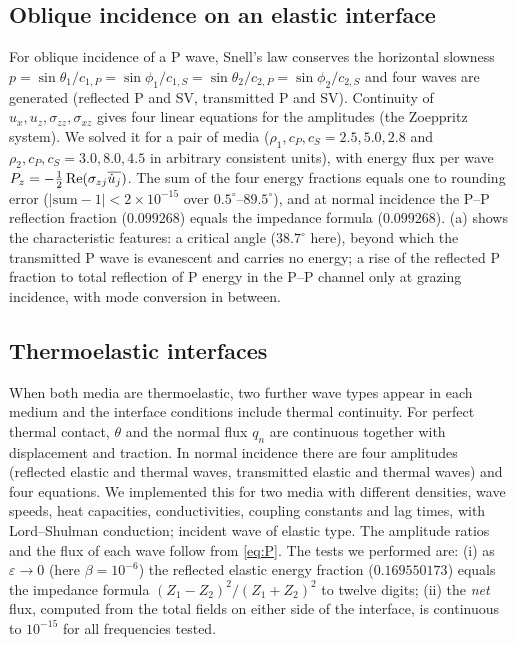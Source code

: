 \subsection{Oblique incidence on an elastic interface}
For oblique incidence of a P wave, Snell's law conserves the horizontal slowness $p=\sin\theta_1/c_{1,P}=\sin\phi_1/c_{1,S}=\sin\theta_2/c_{2,P}=\sin\phi_2/c_{2,S}$ and four waves are generated (reflected P and SV, transmitted P and SV). Continuity of $u_x,u_z,\sigma_{zz},\sigma_{xz}$ gives four linear equations for the amplitudes (the Zoeppritz system). We solved it for a pair of media ($\rho_1,c_P,c_S=2.5,5.0,2.8$ and $\rho_2,c_P,c_S=3.0,8.0,4.5$ in arbitrary consistent units), with energy flux per wave $P_z=-\tfrac12\operatorname{Re}(\sigma_{zj}\overline{\dot u_j})$. The sum of the four energy fractions equals one to rounding error ($|\text{sum}-1|<2\times10^{-15}$ over $0.5^\circ$--$89.5^\circ$), and at normal incidence the P--P reflection fraction ($0.099268$) equals the impedance formula ($0.099268$). (a) shows the characteristic features: a critical angle ($38.7^\circ$ here), beyond which the transmitted P wave is evanescent and carries no energy; a rise of the reflected P fraction to total reflection of P energy in the P--P channel only at grazing incidence, with mode conversion in between.

\subsection{Thermoelastic interfaces}
When both media are thermoelastic, two further wave types appear in each medium and the interface conditions include thermal continuity. For perfect thermal contact, $\theta$ and the normal flux $q_n$ are continuous together with displacement and traction. In normal incidence there are four amplitudes (reflected elastic and thermal waves, transmitted elastic and thermal waves) and four equations. We implemented this for two media with different densities, wave speeds, heat capacities, conductivities, coupling constants and lag times, with Lord--Shulman conduction; incident wave of elastic type. The amplitude ratios and the flux of each wave follow from \eqref{eq:P}. The tests we performed are: (i) as $\varepsilon\to0$ (here $\beta=10^{-6}$) the reflected elastic energy fraction ($0.169550173$) equals the impedance formula $(Z_1-Z_2)^2/(Z_1+Z_2)^2$ to twelve digits; (ii) the \emph{net} flux, computed from the total fields on either side of the interface, is continuous to $10^{-15}$ for all frequencies tested.

